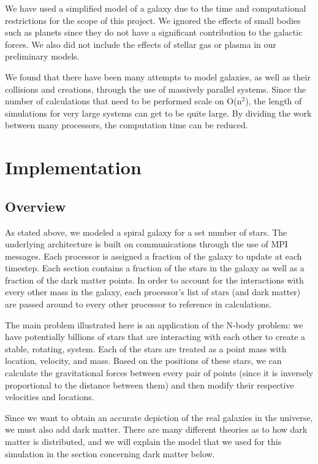 \documentclass{article}
\begin{document}
We have used a simplified model of a galaxy due to the time and computational restrictions for the scope of this project.  We ignored the effects of small bodies such as planets since they do not have a significant contribution to the galactic forces.  We also did not include the effects of stellar gas or plasma in our preliminary models.

We found that there have been many attempts to model galaxies, as well as their collisions and creations, through the use of massively parallel systems.  Since the number of calculations that need to be performed scale on O(n$^2$), the length of simulations for very large systems can get to be quite large.  By dividing the work between many processors, the computation time can be reduced.

\section{Implementation}

\subsection{Overview}

As stated above, we modeled a spiral galaxy for a set number of stars.  The underlying architecture is built on communications through the use of MPI messages. Each processor is assigned a fraction of the galaxy to update at each timestep.  Each section contains a fraction of the stars in the galaxy as well as a fraction of the dark matter points.  In order to account for the interactions with every other mass in the galaxy, each processor's list of stars (and dark matter) are passed around to every other processor to reference in calculations.  

The main problem illustrated here is an application of the N-body problem:  we have potentially billions of stars that are interacting with each other to create a stable, rotating, system.  Each of the stars are treated as a point mass with location, velocity, and mass.  Based on the positions of these stars, we can calculate the gravitational forces between every pair of points (since it is inversely proportional to the distance between them) and then modify their respective velocities and locations.  

Since we want to obtain an accurate depiction of the real galaxies in the universe, we must also add dark matter.  There are many different theories as to how dark matter is distributed, and we will explain the model that we used for this simulation in the section concerning dark matter below.
\end{document}

